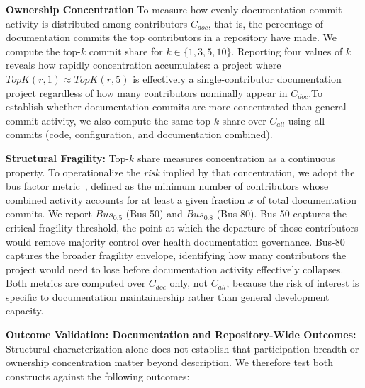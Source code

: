 \documentclass[10pt,conference]{IEEEtran}
\begin{document}
{       
\textbf{Ownership Concentration }
To measure how evenly documentation commit activity is distributed among contributors $C_{\mathit{doc}}$, that is, the percentage of documentation commits the top contributors in a repository have made. 
We compute the top-$k$ commit share for $k \in \{1, 3, 5, 10\}$. 
Reporting four values of $k$ reveals how rapidly
concentration accumulates: a project where
$\mathit{TopK}(r, 1) \approx \mathit{TopK}(r, 5)$ is
effectively a single-contributor documentation project
regardless of how many contributors nominally appear in
$C_{\mathit{doc}}$.To establish whether documentation commits are more
concentrated than general commit activity, we also compute the
same top-$k$ share over $C_{\mathit{all}}$ using all
commits (code, configuration, and documentation combined).

\textbf{Structural Fragility:}
Top-$k$ share measures concentration as a continuous property. To operationalize the \textit{risk} implied by that concentration, we adopt the bus factor metric~\cite{cosentino2015assessing}, defined as the minimum number of contributors whose combined activity accounts for
at least a given fraction $x$ of total documentation commits. \noindent We report $\mathit{Bus}_{0.5}$ (Bus-50) and $\mathit{Bus}_{0.8}$ (Bus-80). Bus-50 captures the critical fragility threshold, the point at which the departure of those contributors would remove majority control over health documentation governance. Bus-80 captures the broader
fragility envelope, identifying how many contributors the project would need to lose before documentation activity effectively collapses. 
Both metrics are computed over $C_{\mathit{doc}}$ only, not
$C_{\mathit{all}}$, because the risk of interest is specific
to documentation maintainership rather than general
development capacity.

\textbf{Outcome Validation: Documentation and Repository-Wide Outcomes:}
\label{sec:outcome_validation}
Structural characterization alone does not establish that participation breadth or ownership concentration matter beyond description. We therefore test both constructs against the following outcomes:

}
\end{document}
